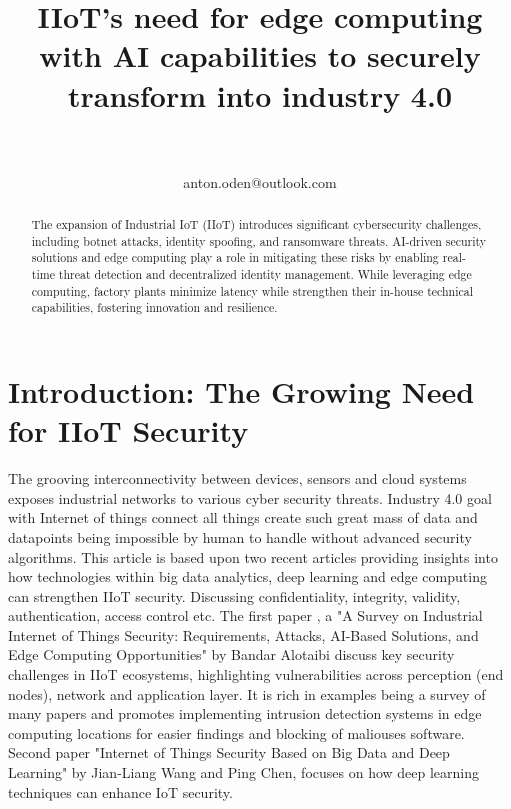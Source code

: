 \documentclass[article,a4paper]{IEEEtran}
\title{IIoT's need for edge computing with AI capabilities to securely transform into industry 4.0}
\author{
\IEEEauthorblockN{Anton Odén}\\
\IEEEauthorblockA{Dept. of Maths and Computer Science\\Karlstad University\\
651 88 KARLSTAD, Sweden}\\
anton.oden@outlook.com
}
\begin{document}
\maketitle

\begin{abstract}
    The expansion of Industrial IoT (IIoT) introduces significant cybersecurity challenges, including botnet attacks, identity spoofing, and ransomware threats. AI-driven security solutions and edge computing play a role in mitigating these risks by enabling real-time threat detection and decentralized identity management. While leveraging edge computing, factory plants minimize latency while strengthen their in-house technical capabilities, fostering innovation and resilience.
\end{abstract}

\section{Introduction: The Growing Need for IIoT Security}
The grooving interconnectivity between devices, sensors and cloud systems exposes industrial networks to various cyber security threats. Industry 4.0 goal with Internet of things connect all things create such great mass of data and datapoints being impossible by human to handle without advanced security algorithms. This article is based upon two recent articles providing insights into how technologies within big data analytics, deep learning and edge computing can strengthen IIoT security. Discussing confidentiality, integrity, validity, authentication, access control etc.     
\newline\newline
The first paper \cite{SurveySecurity}, a "A Survey on Industrial Internet of Things Security: Requirements, Attacks, AI-Based Solutions, and Edge Computing Opportunities" by Bandar Alotaibi discuss key security challenges in IIoT ecosystems, highlighting vulnerabilities across perception (end nodes), network and application layer. It is rich in examples being a survey of many papers and promotes implementing intrusion detection systems in edge computing locations for easier findings and blocking of maliouses software.   
\newline\newline
Second paper \cite{Deeplearning} "Internet of Things Security Based on Big Data and Deep Learning" by Jian-Liang Wang and Ping Chen, focuses on how deep learning techniques can enhance IoT security. 
\end{document}
